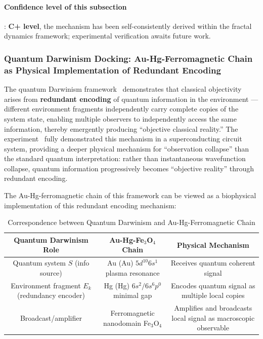 \documentclass[12pt,a4paper,twocolumn]{article}
\begin{document}
\paragraph{Confidence level of this subsection}: \textbf{C+ level}, the mechanism has been self-consistently derived within the fractal dynamics framework; experimental verification awaits future work.

\subsubsection{Quantum Darwinism Docking: Au-Hg-Ferromagnetic Chain as Physical Implementation of Redundant Encoding}
\label{subsec:darwinism}

The quantum Darwinism framework~\cite{Zhu2025} demonstrates that classical objectivity arises from \textbf{redundant encoding} of quantum information in the environment --- different environment fragments independently carry complete copies of the system state, enabling multiple observers to independently access the same information, thereby emergently producing ``objective classical reality.'' The experiment~\cite{Zhu2025} fully demonstrated this mechanism in a superconducting circuit system, providing a deeper physical mechanism for ``observation collapse'' than the standard quantum interpretation: rather than instantaneous wavefunction collapse, quantum information progressively becomes ``objective reality'' through redundant encoding.

The Au-Hg-ferromagnetic chain of this framework can be viewed as a biophysical implementation of this redundant encoding mechanism:

\begin{table}[H]
\centering
\caption{Correspondence between Quantum Darwinism and Au-Hg-Ferromagnetic Chain}
\begin{tabular}{c|c|c}
\hline
\textbf{Quantum Darwinism Role} & \textbf{Au-Hg-Fe$_3$O$_4$ Chain} & \textbf{Physical Mechanism} \\
\hline
Quantum system $S$ (info source) & Au (Au) $5d^{10}6s^1$ plasma resonance & Receives quantum coherent signal \\
Environment fragment $E_k$ (redundancy encoder) & Hg (Hg) $6s^2/6s^6p^0$ minimal gap & Encodes quantum signal as multiple local copies \\
Broadcast/amplifier & Ferromagnetic nanodomain Fe$_3$O$_4$ & Amplifies and broadcasts local signal as macroscopic observable \\
\hline
\end{tabular}
\end{table}
\end{document}

